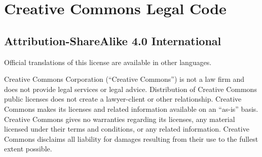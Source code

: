 \begin{comment}
\end{comment}

\section{Creative Commons Legal Code}

\subsection{Attribution-ShareAlike 4.0 International}






Official translations of this license are available in other languages.



\par Creative Commons Corporation (“Creative Commons”) is not a law firm and does not provide legal services or legal advice. Distribution of Creative Commons public licenses does not create a lawyer-client or other relationship. Creative Commons makes its licenses and related information available on an “as-is” basis. Creative Commons gives no warranties regarding its licenses, any material licensed under their terms and conditions, or any related information. Creative Commons disclaims all liability for damages resulting from their use to the fullest extent possible.


